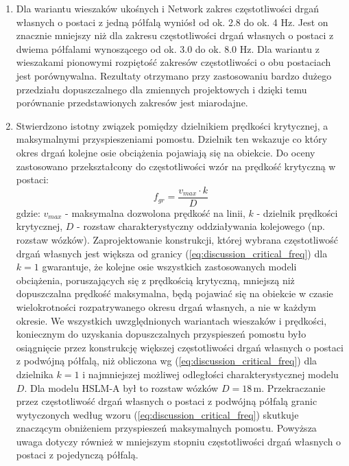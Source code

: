 \begin{enumerate}
\item Dla wariantu wieszaków ukośnych i Network zakres częstotliwości drgań własnych o postaci z jedną półfalą wyniósł od ok. 2.8 do ok. 4 Hz. Jest on znacznie mniejszy niż dla zakresu częstotliwości drgań własnych o postaci z dwiema półfalami wynoszącego od ok. 3.0 do ok. 8.0 Hz. Dla wariantu z wieszakami pionowymi rozpiętość zakresów częstotliwości o obu postaciach jest porównywalna. Rezultaty otrzymano przy zastosowaniu bardzo dużego przedziału dopuszczalnego dla zmiennych projektowych i dzięki temu porównanie przedstawionych zakresów jest miarodajne.

\item Stwierdzono istotny związek pomiędzy dzielnikiem prędkości krytycznej, a maksymalnymi przyspieszeniami pomostu. Dzielnik ten wskazuje co który okres drgań kolejne osie obciążenia pojawiają się na obiekcie. Do oceny zastosowano przekształcony do częstotliwości wzór na prędkość krytyczną w postaci:
\begin{equation} \label{eq:discussion_critical_freq}
	f_{gr} = \frac{v_{max}\cdot k}{D} 
\end{equation}
gdzie: $v_{max}$ - maksymalna dozwolona prędkość na linii, $k$ - dzielnik prędkości krytycznej, $D$ - rozstaw charakterystyczny oddziaływania kolejowego (np. rozstaw wózków). Zaprojektowanie konstrukcji, której wybrana częstotliwość drgań własnych jest większa od granicy (\ref{eq:discussion_critical_freq}) dla $k=1$ gwarantuje, że kolejne osie wszystkich zastosowanych modeli obciążenia, poruszających się z prędkością krytyczną, mniejszą niż dopuszczalna prędkość maksymalna, będą pojawiać się na obiekcie w czasie wielokrotności rozpatrywanego okresu drgań własnych, a nie w każdym okresie. We wszystkich uwzględnionych wariantach wieszaków i prędkości, koniecznym do uzyskania dopuszczalnych przyspieszeń pomostu było osiągnięcie przez konstrukcję większej częstotliwości drgań własnych o postaci z podwójną półfalą, niż obliczona wg (\ref{eq:discussion_critical_freq}) dla dzielnika $k=1$ i najmniejszej możliwej odległości charakterystycznej modelu $D$. Dla modelu HSLM-A był to rozstaw wózków $D=18\,\mathrm{m}$. Przekraczanie przez częstotliwość drgań własnych o postaci z podwójną półfalą granic wytyczonych według wzoru (\ref{eq:discussion_critical_freq}) skutkuje znaczącym obniżeniem przyspieszeń maksymalnych pomostu. Powyższa uwaga dotyczy również w mniejszym stopniu częstotliwości drgań własnych o postaci z pojedynczą półfalą. 

\end{enumerate}

